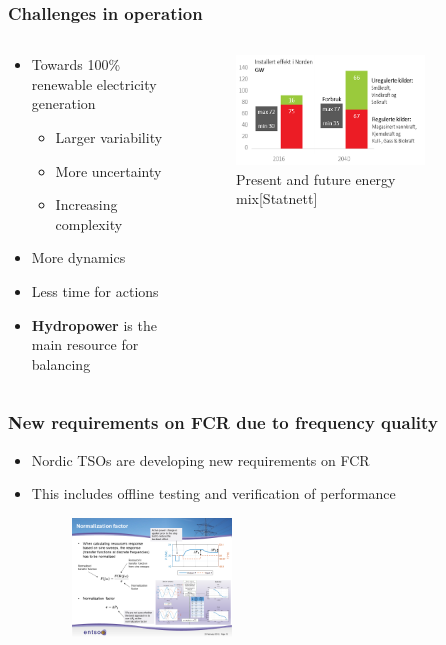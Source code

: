 \begin{frame}
	\frametitle{Challenges in operation}
	\begin{columns}
		\begin{column}{0.5\textwidth}
		\begin{itemize}
			\item<1-> Towards 100\% renewable electricity generation
			\begin{itemize}
				\item Larger variability
				\item More uncertainty
				\item Increasing complexity
			\end{itemize}
			\item<2-> More dynamics
			\item<3-> Less time for actions
			\item<4-> \textbf{Hydropower} is the main resource for balancing
\end{itemize}
\end{column}
	\begin{column}{0.5\textwidth}
		\begin{figure}
			\includegraphics[width=0.8\textwidth]{./pictures/mix}
			\caption{Present and future energy mix[Statnett]}
		\end{figure}
	\end{column}
	\end{columns}
\end{frame}
\begin{frame}
	\frametitle{New requirements on FCR due to frequency quality}
	\begin{itemize}
		\item Nordic TSOs are developing new requirements on FCR
		\item This includes offline testing and verification of performance
		\begin{figure}
				\includegraphics[width=0.4\textwidth]{./pictures/fcr}
		\end{figure}
	\end{itemize}
\end{frame}
